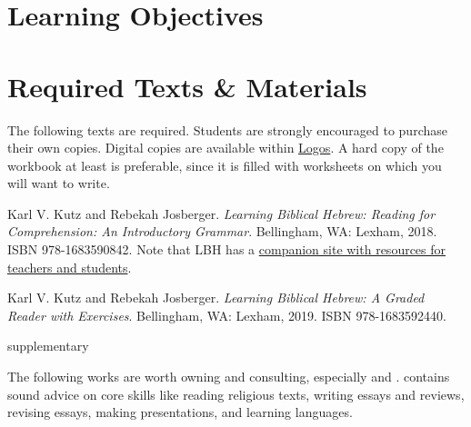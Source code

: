 \documentclass[titlepage]{article}
\newcommand\incl{../includes}
\begin{document}


  \section{Learning Objectives}
  \label{objectives}

  \edobject

\section{Required Texts \& Materials}
\label{texts}

The following texts are required. Students are strongly encouraged to
purchase their own copies. Digital copies are available within
\href{https://www.logos.com/product/177582/learning-biblical-hebrew-bundle}{Logos}.
A hard copy of the workbook at least is preferable, since it is filled
with worksheets on which you will want to write.

\begingroup
\renewcommand{\section}[2]{}%
\begin{thebibliography}{Workbook}%

    Karl V. Kutz and Rebekah Josberger.
    \emph{Learning Biblical Hebrew: Reading for Comprehension: An Introductory Grammar}.
    Bellingham, WA: Lexham, 2018. ISBN 978-1683590842.
    Note that LBH has a \href{http://www.learningbiblicalhebrew.com/}{companion site with resources for teachers and students}.

    Karl V. Kutz and Rebekah Josberger.
    \emph{Learning Biblical Hebrew: A Graded Reader with Exercises}.
    Bellingham, WA: Lexham, 2019. ISBN 978-1683592440.

\end{thebibliography}
\endgroup


\section{Supplementary Texts}
\label{supplementary}

The following works are worth owning and consulting, especially
\cite{bhs} and \cite{bdb}. \cite{rlgs} contains sound advice on core
skills like reading religious texts, writing essays and reviews,
revising essays, making presentations, and learning languages.
\end{document}
